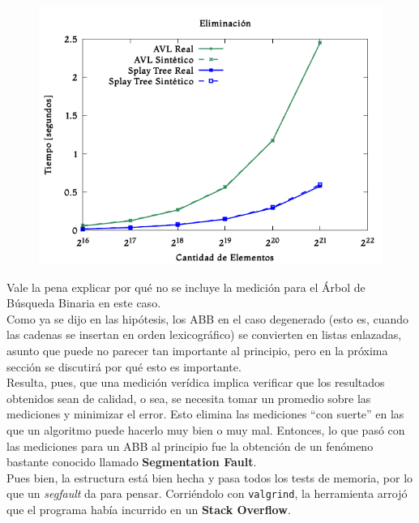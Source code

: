 \documentclass[12pt,letterpaper]{report}
\begin{document}
\begin{figure}[H]
\begin{center}
\includegraphics[scale=0.65]{degenerado_eliminacion.png}
\end{center}
\end{figure}

Vale la pena explicar por qué no se incluye la medición para el Árbol de Búsqueda Binaria en este caso.\\

Como ya se dijo en las hipótesis, los ABB en el caso degenerado (esto es, cuando las cadenas se insertan en orden lexicográfico) se convierten en listas enlazadas, asunto que puede no parecer tan importante al principio, pero en la próxima sección se discutirá por qué esto es importante.\\

Resulta, pues, que una medición verídica implica verificar que los resultados obtenidos sean de calidad, o sea, se necesita tomar un promedio sobre las mediciones y minimizar el error. Esto elimina las mediciones ``con suerte'' en las que un algoritmo puede hacerlo muy bien o muy mal. Entonces, lo que pasó con las mediciones para un ABB al principio fue la obtención de un fenómeno bastante conocido llamado \textbf{Segmentation Fault}.\\

Pues bien, la estructura está bien hecha y pasa todos los tests de memoria, por lo que un \emph{segfault} da para pensar. Corriéndolo con \texttt{valgrind}, la herramienta arrojó que el programa había incurrido en un \textbf{Stack Overflow}.\\
\end{document}
